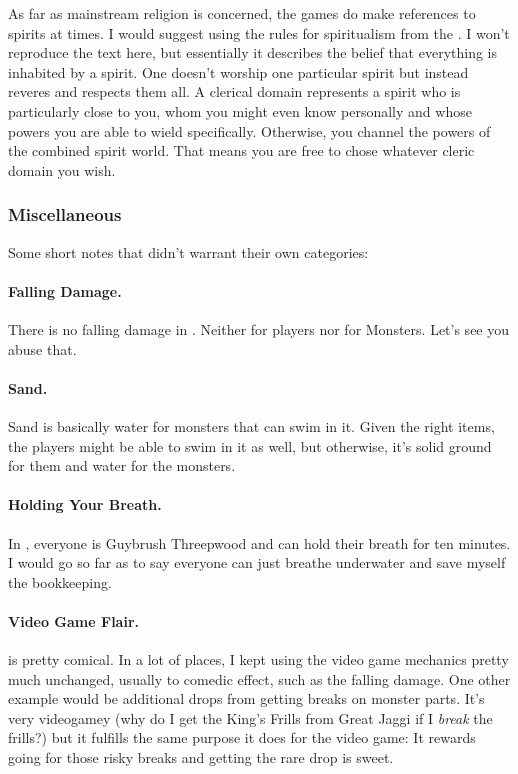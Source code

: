 As far as mainstream religion is concerned, the games do make references to spirits at times. I would suggest using the rules for spiritualism from the \DMG. I won't reproduce the text here, but essentially it describes the belief that everything is inhabited by a spirit. One doesn't worship one particular spirit but instead reveres and respects them all. A clerical domain represents a spirit who is particularly close to you, whom you might even know personally and whose powers you are able to wield specifically. Otherwise, you channel the powers of the combined spirit world. That means you are free to chose whatever cleric domain you wish.

\subsubsection{Miscellaneous}
Some short notes that didn't warrant their own categories:

\paragraph{Falling Damage.} There is no falling damage in \MH{}. Neither for players nor for Monsters. Let's see you abuse that.
\paragraph{Sand.} Sand is basically water for monsters that can swim in it. Given the right items, the players might be able to swim in it as well, but otherwise, it's solid ground for them and water for the monsters.
\paragraph{Holding Your Breath.} In \MH{}, everyone is Guybrush Threepwood and can hold their breath for ten minutes. I would go so far as to say everyone can just breathe underwater and save myself the bookkeeping.
\paragraph{Video Game Flair.} \MH{} is pretty comical. In a lot of places, I kept using the video game mechanics pretty much unchanged, usually to comedic effect, such as the falling damage. One other example would be additional drops from getting breaks on monster parts. It's very videogamey (why do I get the King's Frills from Great Jaggi if I \emph{break} the frills?) but it fulfills the same purpose it does for the video game: It rewards going for those risky breaks and getting the rare drop is sweet.
\hbWideBottomArtFirstPageFix
